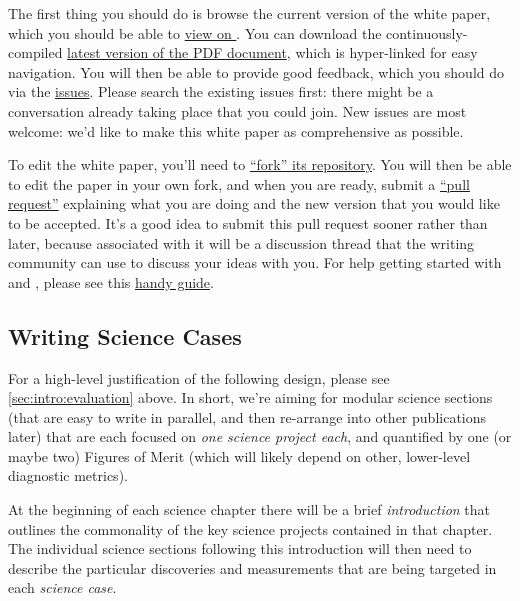 The first thing you should do is browse the current version of the white
paper, which you should be able to \href{http://ls.st/iw2}{view on
\GitHub}. You can download the  continuously-compiled
\href{http://www.slac.stanford.edu/~digel/ObservingStrategy/whitepaper/LSST_Observing_Strategy_White_Paper.pdf}{latest
version of the PDF document}, which is hyper-linked for easy navigation.
You will then be able to provide good feedback, which you should do via
the
\href{https://github.com/LSSTScienceCollaborations/ObservingStrategy/issues}{\GitHub
issues}. Please search the existing issues first: there might be a
conversation already taking place that you could join. New issues are
most welcome: we'd like to make this white paper as comprehensive as
possible.

To edit the white paper, you'll need to
\href{https://help.github.com/articles/fork-a-repo/}{``fork'' its
repository}. You will then  be able to edit the paper in your own
fork, and when you are ready,  submit a
\href{https://help.github.com/articles/using-pull-requests/}{``pull
request''} explaining what you are doing and the new version that  you
would like to be accepted. It's a good idea to submit this pull
request sooner rather than later, because associated with it will be a
discussion thread that the writing community can use to discuss your
ideas with you. For help getting started with \git and \GitHub, please
see this
\href{https://github.com/drphilmarshall/GettingStarted#top}{handy
guide}.


\subsection{Writing Science Cases}

For a high-level justification of the following design, please see
\autoref{sec:intro:evaluation} above. In short, we're aiming for modular
science sections (that are easy to write in parallel, and then
re-arrange into other publications later) that are each focused on {\it
one science project each}, and quantified by one (or maybe two) Figures
of Merit (which will likely depend on other, lower-level diagnostic
metrics).

At the beginning of each science chapter there will be a brief
\textit{introduction} that outlines the commonality of the key science
projects contained in that chapter. The individual science sections
following this introduction will then need to describe the particular
discoveries and measurements that are being targeted in each
\textit{science case}.

